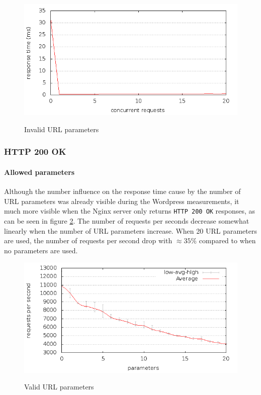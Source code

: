 \documentclass[Measurements]{subfiles}
\begin{document}
\begin{figure}[H]
\caption{Invalid URL parameters}
\centering
\includegraphics[scale=0.55] {images/results/wp_with_naxsi_incremented_disallowed_parameters/output.png}
\label{fig:Invalid parameters}
\end{figure}

\subsubsection{HTTP 200 OK}

\paragraph{Allowed parameters}
Although the number influence on the response time cause by the number of \ac{URL} parameters was already visible during the Wordpress measurements, it much more visible when the Nginx server only returns  \verb+HTTP 200 OK+ responses, as can be seen in figure \ref{fig:HTTP 200 OK: valid url parameters}. The number of requests per seconds decrease somewhat linearly when the number of \ac{URL} parameters increase. When 20 \ac{URL} parameters are used, the number of requests per second drop with $\approx 35\%$ compared to when no parameters are used.

\begin{figure}[H]
\caption{Valid URL parameters}
\centering
\includegraphics[scale=0.55] {images/results/200_with_naxsi_incremented_allowed_parameters/output.png}
\label{fig:HTTP 200 OK: valid url parameters}
\end{figure}
\end{document}
